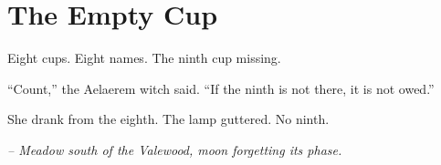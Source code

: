 \chapter*{The Empty Cup}

Eight cups. Eight names. The ninth cup missing.

``Count,'' the Aelaerem witch said. ``If the ninth is not there, it is not owed.''

She drank from the eighth. The lamp guttered. No ninth.

\smallskip

\noindent \textit{-- Meadow south of the Valewood, moon forgetting its phase.}

